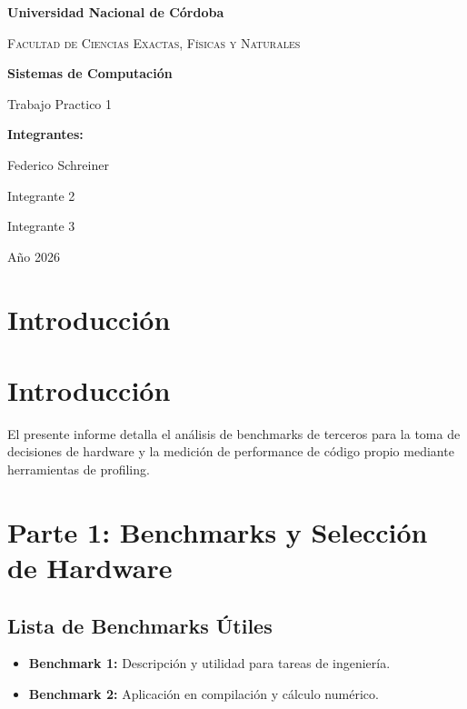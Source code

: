 \documentclass[12pt,a4paper]{article}
\begin{document}
	
	\begin{titlepage}
		\centering
		{\bfseries\LARGE Universidad Nacional de Córdoba \par}
		{\scshape\Large Facultad de Ciencias Exactas, Físicas y Naturales \par}
		\vspace{2cm}
		\vspace{1.5cm}
		{\bfseries\huge Sistemas de Computación \par}
		\vspace{1cm}
		{\Large Trabajo Practico 1\par}
		\vspace{2cm}
		
		{\Large \textbf{Integrantes:}} \par
		\vspace{0.5cm}
		{\large Federico Schreiner \par}
		{\large Integrante 2 \par}
		{\large Integrante 3 \par}
		
		\vfill
		{\Large Año 2026 \par}
	\end{titlepage}
	
	\newpage
	\tableofcontents %
	\newpage
	
	\section{Introducción}
	\section{Introducción}
	El presente informe detalla el análisis de benchmarks de terceros para la toma de decisiones de hardware y la medición de performance de código propio mediante herramientas de profiling.
	
	\section{Parte 1: Benchmarks y Selección de Hardware}
	
	\subsection{Lista de Benchmarks Útiles}
	\begin{itemize}
		\item \textbf{Benchmark 1:} Descripción y utilidad para tareas de ingeniería.
		\item \textbf{Benchmark 2:} Aplicación en compilación y cálculo numérico.
	\end{itemize}
	
\end{document}
